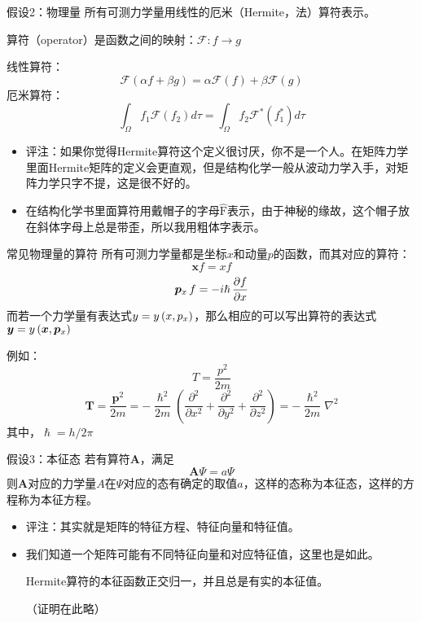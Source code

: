 \documentclass[10pt,compress,t]{ctexbeamer}
\begin{document}
\begin{frame}
\begin{block}{假设2：物理量}
    所有可测力学量用线性的厄米（Hermite，法）算符表示。

    算符（operator）是函数之间的映射：$ \mathscr{F} : f \rightarrow  g$

    线性算符：
    $$ \mathscr{F} (\alpha f + \beta g ) = \alpha  \mathscr{F} (f) + \beta  \mathscr{F} (g) $$
    厄米算符：
    $$ \int _{\Omega} f_1 \mathscr{F} (f_2) d\tau = \int _{\Omega} f_2 \mathscr{F}^* (f_1^*) d\tau  $$
\end{block}  
\begin{itemize}
    \item 评注：如果你觉得Hermite算符这个定义很讨厌，你不是一个人。在矩阵力学里面Hermite矩阵的定义会更直观，但是结构化学一般从波动力学入手，对矩阵力学只字不提，这是很不好的。
    \item 在结构化学书里面算符用戴帽子的字母$\hat{\mathrm{F}}$表示，由于神秘的缘故，这个帽子放在斜体字母上总是带歪，所以我用粗体字表示。
\end{itemize}
\end{frame}

\begin{frame}
\begin{block}{常见物理量的算符}
    所有可测力学量都是坐标$x$和动量$p$的函数，而其对应的算符：
    $$\bm{x} f =  xf $$
    $$\bm{p}_x \thinspace f =  -i\hslash \thinspace \frac{\partial f}{\partial x} $$
    而若一个力学量有表达式$y=y \thinspace (x,p_x)$，那么相应的可以写出算符的表达式$\bm{y} =y \thinspace (\bm{x} ,\bm{p}_x)$

    例如：
    $$T=\frac{p^2}{2m}$$
    $$\bm{T}=\frac{\bm{p}^2}{2m}=-\frac{\hslash^2}{2m} (\frac{\partial^2 }{\partial x^2}+\frac{\partial^2 }{\partial y^2}+\frac{\partial^2 }{\partial z^2})=-\frac{\hslash^2}{2m} \nabla ^2 $$
    其中，$\hslash=h / 2\pi$
\end{block}  
\end{frame}

\begin{frame}
\begin{block}{假设3：本征态}
    若有算符$\bm{A}$，满足
    $$\bm{A} \Psi = a \Psi $$
    则$\bm{A}$对应的力学量$A$在$\Psi$对应的态有确定的取值$a$，这样的态称为本征态，这样的方程称为本征方程。
\end{block}  
\begin{itemize}
    \item
    评注：其实就是矩阵的特征方程、特征向量和特征值。
    \item
    我们知道一个矩阵可能有不同特征向量和对应特征值，这里也是如此。

    Hermite算符的本征函数正交归一，并且总是有实的本征值。

    （证明在此略）
\end{itemize}
\end{frame}
\end{document}
